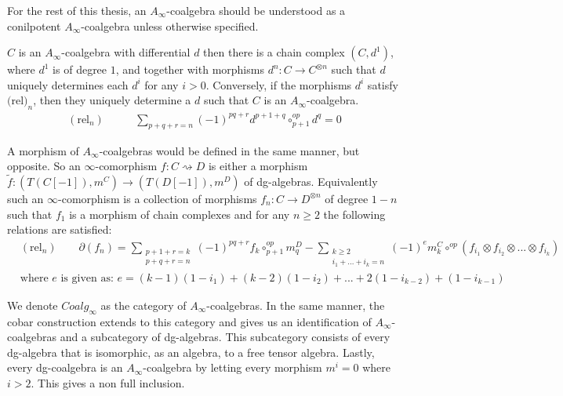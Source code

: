 \documentclass[../thesis.tex]{subfiles}
\begin{document}
        \begin{remark}
            For the rest of this thesis, an $A_\infty$-coalgebra should be understood as a conilpotent $A_\infty$-coalgebra unless otherwise specified.
        \end{remark}

        \begin{corollary}
            $C$ is an $A_\infty$-coalgebra with differential $d$ then there is a chain complex $(C, d^1)$, where $d^1$ is of degree $1$, and together with morphisms $d^n : C \rightarrow C^{\otimes n}$ such that $d$ uniquely determines each $d^i$ for any $i>0$. Conversely, if the morphisms $d^i$ satisfy $\text{(rel)}_n$, then they uniquely determine a $d$ such that $C$ is an $A_\infty$-coalgebra.
            \begin{align*}
                (\text{rel}_n)\qquad & \sum_{p+q+r = n}(-1)^{pq+r}d^{p+1+q}\circ^{op}_{p+1}d^q = 0
            \end{align*}
        \end{corollary}

        A morphism of $A_\infty$-coalgebras would be defined in the same manner, but opposite. So an $\infty$-comorphism $f: C \rightsquigarrow D$ is either a morphism $\widetilde{f}: (T(C[-1]), m^C) \rightarrow (T(D[-1]),m^D)$ of dg-algebras. Equivalently such an $\infty$-comorphism is a collection of morphisms $f_n : C \rightarrow D^{\otimes n}$ of degree $1-n$ such that $f_1$ is a morphism of chain complexes and for any $n\geq 2$ the following relations are satisfied:
        \begin{align*}
            & (\text{rel}_n)\qquad \partial(f_n) = \sum_{\substack{p + 1 + r = k \\ p + q + r = n}}(-1)^{pq+r}f_k\circ^{op}_{p+1}m^D_q - \sum_{\substack{k\geq 2 \\ i_1 + ... + i_k = n}}(-1)^{e}m^C_k \circ^{op} (f_{i_1}\otimes f_{i_2}\otimes ... \otimes f_{i_k}) \\
            & \text{where } e \text{ is given as: } e = (k-1)(1-i_1) + (k-2)(1-i_2) + ... + 2(1-i_{k-2}) + (1-i_{k-1})
        \end{align*}

        We denote $Coalg_\infty$ as the category of $A_\infty$-coalgebras. In the same manner, the cobar construction extends to this category and gives us an identification of $A_\infty$-coalgebras and a subcategory of dg-algebras. This subcategory consists of every dg-algebra that is isomorphic, as an algebra, to a free tensor algebra. Lastly, every dg-coalgebra is an $A_\infty$-coalgebra by letting every morphism $m^i = 0$ where $i>2$. This gives a non full inclusion. 
\end{document}
